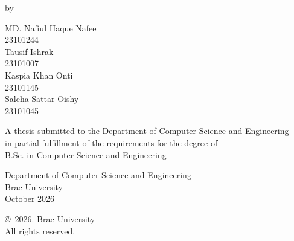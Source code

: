 \begin{titlepage}
\renewcommand*{\thepage}{Title}
\begin{center}
\vspace*{2.2cm}
{\fontsize{16pt}{21pt}\selectfont{Bridging Bangla Dialects and Standard Bangla:\\[3pt]
A Dialect-Aware Bangla Question Answering with\\
Routed Domain Experts and Retrieval-Augmented\\
Generation for Healthcare and Education}}

\vspace{1.3cm}
by

\vspace{0.55cm}
MD. Nafiul Haque Nafee\\23101244\\[0.25cm]
Tausif Ishrak\\23101007\\[0.25cm]
Kaspia Khan Onti\\23101145\\[0.25cm]
Saleha Sattar Oishy\\23101045

\vspace{1.35cm}
A thesis submitted to the Department of Computer Science and Engineering\\
in partial fulfillment of the requirements for the degree of\\
B.Sc. in Computer Science and Engineering

\vfill
Department of Computer Science and Engineering\\
Brac University\\
October 2026

\vspace{1.1cm}
\copyright\ 2026. Brac University\\
All rights reserved.
\end{center}
\end{titlepage}
